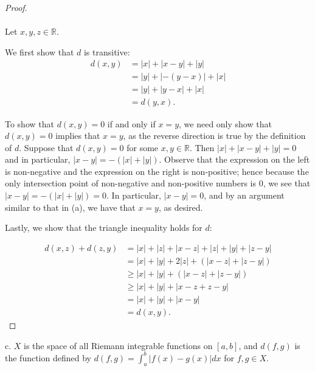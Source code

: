     \begin{proof}\ \\\\
        Let $x, y, z \in \mathbb{R}$.
        
        We first show that $d$ is transitive:
        \begin{align*}
            d(x, y) &= |x| + |x - y| + |y| \\
                    &= |y| + |-(y - x)| + |x| \\
                    &= |y| + |y - x| + |x| \\
                    &= d(y, x).
        \end{align*}

        To show that $d(x, y) = 0$ if and only if $x = y$, we need only show that $d(x, y) = 0$ implies that
        $x = y$, as the reverse direction is true by the definition of $d$. Suppose that $d(x, y) = 0$ for 
        some $x, y \in \mathbb{R}$. Then $|x| + |x - y| + |y| = 0$ and in particular, $|x - y| = -(|x| + |y|)$.
        Observe that the expression on the left is non-negative and the expression on the right is
        non-positive; hence because the only intersection point of non-negative and non-positive numbers is 0, we
        see that $|x - y| = -(|x| + |y|) = 0$. In particular, $|x - y| = 0$, and by an argument similar to that
        in (a), we have that $x = y$, as desired.

        Lastly, we show that the triangle inequality holds for $d$:

        \begin{align*}
            d(x, z) + d(z, y) &= |x| + |z| + |x - z| + |z| + |y| + |z - y| \\
                              &= |x| + |y| + 2|z| + (|x - z| + |z - y|) \\
                              &\ge |x| + |y| + (|x - z| + |z - y|) \\
                              &\ge |x| + |y| + |x - z + z - y| \\
                              &= |x| + |y| + |x - y| \\
                              &= d(x, y).
        \end{align*}
    \end{proof}

    \pagebreak

c.  $X$ is the space of all Riemann integrable functions on $[a, b]$, and 
    $d(f, g)$ is the function defined by 
    $d(f, g) = \int_a^b{|f(x) - g(x)|dx}$ for $f, g \in X$. \ \\

